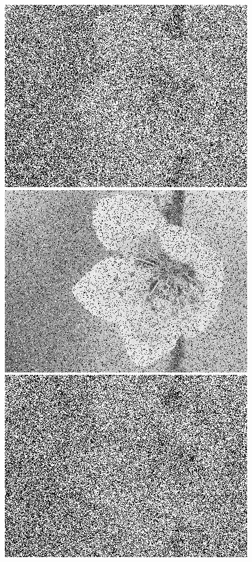 \documentclass[10pt,aspectratio=43,mathserif]{beamer}
\begin{document}
\begin{frame}
\begin{columns}
\includegraphics[scale=0.2]{exp-3.jpg}
\includegraphics[scale=0.2]{exp-7.jpg}
\includegraphics[scale=0.2]{exp-11.jpg}

\end{columns}
\end{frame}
\end{document}

